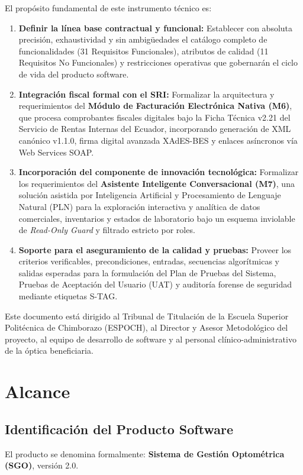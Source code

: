 \documentclass[12pt,a4paper]{report}
\begin{document}
El propósito fundamental de este instrumento técnico es:
\begin{enumerate}[label=\alph*)]
    \item \textbf{Definir la línea base contractual y funcional:} Establecer con absoluta precisión, exhaustividad y sin ambigüedades el catálogo completo de funcionalidades (31 Requisitos Funcionales), atributos de calidad (11 Requisitos No Funcionales) y restricciones operativas que gobernarán el ciclo de vida del producto software.
    \item \textbf{Integración fiscal formal con el SRI:} Formalizar la arquitectura y requerimientos del \textbf{Módulo de Facturación Electrónica Nativa (M6)}, que procesa comprobantes fiscales digitales bajo la Ficha Técnica v2.21 del Servicio de Rentas Internas del Ecuador, incorporando generación de XML canónico v1.1.0, firma digital avanzada XAdES-BES y enlaces asíncronos vía Web Services SOAP.
    \item \textbf{Incorporación del componente de innovación tecnológica:} Formalizar los requerimientos del \textbf{Asistente Inteligente Conversacional (M7)}, una solución asistida por Inteligencia Artificial y Procesamiento de Lenguaje Natural (PLN) para la exploración interactiva y analítica de datos comerciales, inventarios y estados de laboratorio bajo un esquema inviolable de \textit{Read-Only Guard} y filtrado estricto por roles.
    \item \textbf{Soporte para el aseguramiento de la calidad y pruebas:} Proveer los criterios verificables, precondiciones, entradas, secuencias algorítmicas y salidas esperadas para la formulación del Plan de Pruebas del Sistema, Pruebas de Aceptación del Usuario (UAT) y auditoría forense de seguridad mediante etiquetas S-TAG.
\end{enumerate}

Este documento está dirigido al Tribunal de Titulación de la Escuela Superior Politécnica de Chimborazo (ESPOCH), al Director y Asesor Metodológico del proyecto, al equipo de desarrollo de software y al personal clínico-administrativo de la óptica beneficiaria.

\section{Alcance}
\subsection{Identificación del Producto Software}
El producto se denomina formalmente: \textbf{Sistema de Gestión Optométrica (SGO)}, versión 2.0.
\end{document}
